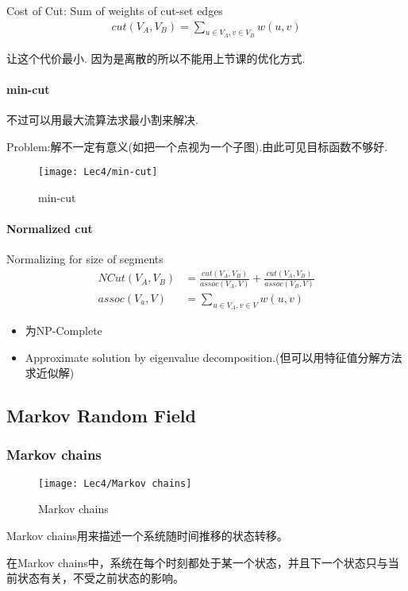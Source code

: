 Cost of Cut: Sum of weights of cut-set edges
\begin{align*}
    cut(V_A,V_B)=\sum_{u\in V_A, v\in V_B}w(u,v)
\end{align*}

让这个代价最小. 因为是离散的所以不能用上节课的优化方式. 

\paragraph{min-cut}
不过可以用最大流算法求最小割来解决. 

Problem:解不一定有意义(如把一个点视为一个子图).由此可见目标函数不够好. 
\begin{figure}[H]
    \centering
    \texttt{[image: Lec4/min-cut]}
    \caption{min-cut}
\end{figure}

\paragraph{Normalized cut}
Normalizing for size of segments
\begin{align*}
    NCut(V_A,V_B)&=\frac{cut(V_A,V_B)}{assoc(V_A,V)}+\frac{cut(V_A,V_B)}{assoc(V_B,V)}\\
    assoc(V_a,V)&=\sum_{u\in V_A, v\in V} w(u,v)
\end{align*}
\begin{itemize}
    \item 为NP-Complete
    \item Approximate solution by eigenvalue
    decomposition.(但可以用特征值分解方法求近似解)
\end{itemize}

\subsection{Markov Random Field}
\subsubsection{Markov chains}
\begin{figure}[H]
    \centering
    \texttt{[image: Lec4/Markov chains]}
    \caption{Markov chains}
\end{figure}
Markov chains用来描述一个系统随时间推移的状态转移。

在Markov chains中，系统在每个时刻都处于某一个状态，并且下一个状态只与当前状态有关，不受之前状态的影响。

